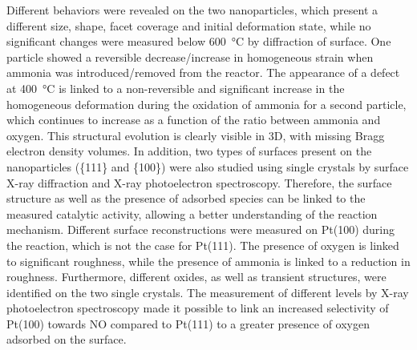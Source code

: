 \begin{mdframed}[linecolor=Prune,linewidth=1]
\begin{multicols}{2}
Different behaviors were revealed on the two nanoparticles, which present a different size, shape, facet coverage and initial deformation state, while no significant changes were measured below \qty{600}{\degreeCelsius} by diffraction of surface.
One particle showed a reversible decrease/increase in homogeneous strain when ammonia was introduced/removed from the reactor.
The appearance of a defect at \qty{400}{\degreeCelsius} is linked to a non-reversible and significant increase in the homogeneous deformation during the oxidation of ammonia for a second particle, which continues to increase as a function of the ratio between ammonia and oxygen.
This structural evolution is clearly visible in 3D, with missing Bragg electron density volumes.
In addition, two types of surfaces present on the nanoparticles (\{111\} and \{100\}) were also studied using single crystals by surface X-ray diffraction and X-ray photoelectron spectroscopy.
Therefore, the surface structure as well as the presence of adsorbed species can be linked to the measured catalytic activity, allowing a better understanding of the reaction mechanism.
Different surface reconstructions were measured on Pt(100) during the reaction, which is not the case for Pt(111).
The presence of oxygen is linked to significant roughness, while the presence of ammonia is linked to a reduction in roughness.
Furthermore, different oxides, as well as transient structures, were identified on the two single crystals.
The measurement of different levels by X-ray photoelectron spectroscopy made it possible to link an increased selectivity of Pt(100) towards NO compared to Pt(111) to a greater presence of oxygen adsorbed on the surface.
\end{multicols}

\end{mdframed}

\normalsize

\vspace{\fill} %

\newpage\thispagestyle{empty}\null\newpage